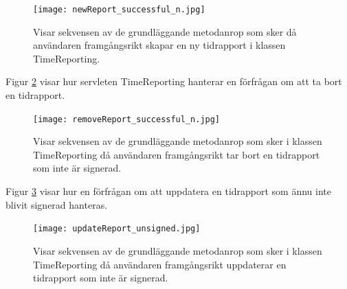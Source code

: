 \documentclass[a4paper]{article}
\begin{document}
\begin{figure}[h!]
\centering
\texttt{[image: newReport\_successful\_n.jpg]}
\caption{Visar sekvensen av de grundläggande metodanrop som sker då användaren framgångsrikt skapar en ny tidrapport i klassen TimeReporting.
\label{newReport}}
\end{figure}

\noindent
Figur \ref{removeReport} visar hur servleten TimeReporting hanterar en förfrågan om att ta bort en tidrapport.

\begin{figure}[h!]
\centering
\texttt{[image: removeReport\_successful\_n.jpg]}
\caption{Visar sekvensen av de grundläggande metodanrop som sker i klassen TimeReporting då användaren framgångsrikt tar bort en tidrapport som inte är signerad.
\label{removeReport}}
\end{figure}


\noindent
Figur \ref{updateReportUnsigned} visar hur en förfrågan om att uppdatera en tidrapport som ännu inte blivit signerad hanteras.


\begin{figure}[h!]
\centering
\texttt{[image: updateReport\_unsigned.jpg]}
\caption{Visar sekvensen av de grundläggande metodanrop som sker i klassen TimeReporting då användaren framgångsrikt uppdaterar en tidrapport som inte är signerad.
\label{updateReportUnsigned}}
\end{figure}
\end{document}
